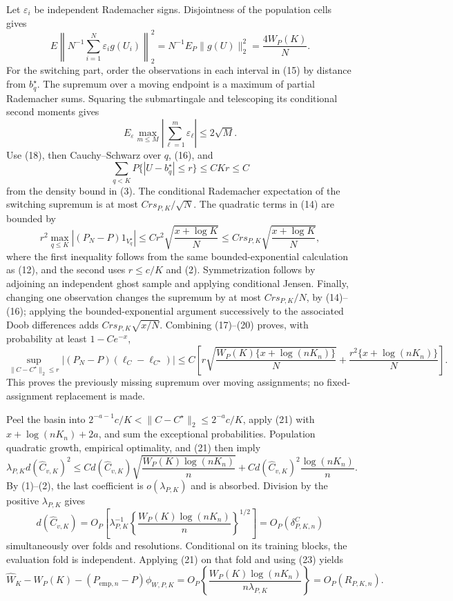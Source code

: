 Let \(\varepsilon_i\) be independent Rademacher signs.  Disjointness of the population cells gives
\[
 E\left\|N^{-1}\sum_{i=1}^N\varepsilon_i g(U_i)\right\|_2^2
 =N^{-1}E_P\|g(U)\|_2^2=\frac{4W_P(K)}N.                                     \tag{17}
\]
For the switching part, order the observations in each interval in (15) by distance from \(b_q^\star\).  The supremum over a moving endpoint is a maximum of partial Rademacher sums.  Squaring the submartingale and telescoping its conditional second moments gives
\[
 E_\varepsilon\max_{m\leq M}\left|\sum_{\ell=1}^m\varepsilon_\ell\right|
 \leq2\sqrt M.                                                                 \tag{18}
\]
Use (18), then Cauchy--Schwarz over \(q\), (16), and
\[
 \sum_{q<K}P\{|U-b_q^\star|\leq r\}
 \leq C K r\leq C                                                             \tag{19}
\]
from the density bound in (3).  The conditional Rademacher expectation of the switching supremum is at most \(Crs_{P,K}/\sqrt N\).  The quadratic terms in (14) are bounded by
\[
 r^2\max_{q\leq K}|(P_N-P)1_{V_q^\star}|
 \leq Cr^2\sqrt{\frac{x+\log K}{N}}
 \leq Crs_{P,K}\sqrt{\frac{x+\log K}{N}},                                     \tag{20}
\]
where the first inequality follows from the same bounded-exponential calculation as (12), and the second uses \(r\leq c/K\) and (2).  Symmetrization follows by adjoining an independent ghost sample and applying conditional Jensen.  Finally, changing one observation changes the supremum by at most \(Crs_{P,K}/N\), by (14)--(16); applying the bounded-exponential argument successively to the associated Doob differences adds \(Crs_{P,K}\sqrt{x/N}\).  Combining (17)--(20) proves, with probability at least \(1-Ce^{-x}\),
\[
 \sup_{\|C-C^\star\|_2\leq r}
 |(P_N-P)(\ell_C-\ell_{C^\star})|
 \leq C\left[
 r\sqrt{\frac{W_P(K)\{x+\log(nK_n)\}}N}
 +\frac{r^2\{x+\log(nK_n)\}}N\right].                                        \tag{21}
\]
This proves the previously missing supremum over moving assignments; no fixed-assignment replacement is made.

Peel the basin into \(2^{-a-1}c/K<\|C-C^\star\|_2\leq2^{-a}c/K\), apply (21) with \(x+\log(nK_n)+2a\), and sum the exceptional probabilities.  Population quadratic growth, empirical optimality, and (21) then imply
\[
 \lambda_{P,K}d(\widehat C_{v,K})^2
 \leq C d(\widehat C_{v,K})
 \sqrt{\frac{W_P(K)\log(nK_n)}n}
 +C d(\widehat C_{v,K})^2\frac{\log(nK_n)}n.                                  \tag{22}
\]
By (1)--(2), the last coefficient is \(o(\lambda_{P,K})\) and is absorbed.  Division by the positive \(\lambda_{P,K}\) gives
\[
 d(\widehat C_{v,K})
 =O_P\!\left[\lambda_{P,K}^{-1}
 \left\{\frac{W_P(K)\log(nK_n)}n\right\}^{1/2}\right]
 =O_P(\delta^C_{P,K,n})                                                       \tag{23}
\]
simultaneously over folds and resolutions.  Conditional on its training blocks, the evaluation fold is independent.  Applying (21) on that fold and using (23) yields
\[
 \widehat W_K-W_P(K)-(P_{\mathrm{emp},n}-P)\phi_{W,P,K}
 =O_P\!\left\{\frac{W_P(K)\log(nK_n)}{n\lambda_{P,K}}\right\}
 =O_P(R_{P,K,n}).                                                              \tag{24}
\]

